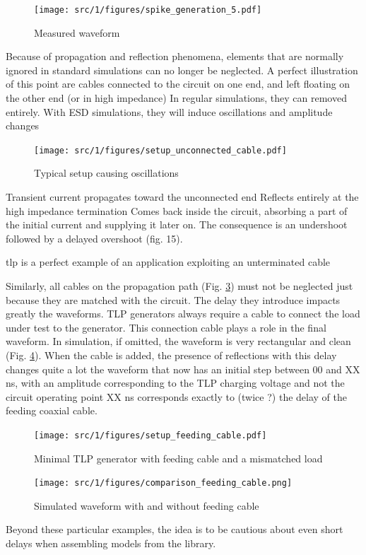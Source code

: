 \begin{figure}[!h]
  \centering
  \texttt{[image: src/1/figures/spike\_generation\_5.pdf]}
  \caption{Measured waveform}
  \label{fig:spike-step-4}
\end{figure}

Because of propagation and reflection phenomena, elements that are normally ignored in standard simulations can no longer be neglected.
A perfect illustration of this point are cables connected to the circuit on one end, and left floating on the other end (or in high impedance)
In regular simulations, they can removed entirely.
With ESD simulations, they will induce oscillations and amplitude changes

\begin{figure}[!h]
  \centering
  \texttt{[image: src/1/figures/setup\_unconnected\_cable.pdf]}
  \caption{Typical setup causing oscillations}
  \label{fig:setup-unconnected-cable}
\end{figure}

Transient current propagates toward the unconnected end
Reflects entirely at the high impedance termination
Comes back inside the circuit, absorbing a part of the initial current and supplying it later on.
The consequence is an undershoot followed by a delayed overshoot (fig. 15).

\gls{tlp} is a perfect example of an application exploiting an unterminated cable

Similarly, all cables on the propagation path (Fig. \ref{fig:setup-feeding-cable}) must not be neglected just because they are matched with the circuit.
The delay they introduce impacts greatly the waveforms.
TLP generators always require a cable to connect the load under test to the generator.
This connection cable plays a role in the final waveform.
In simulation, if omitted, the waveform is very rectangular and clean (Fig. \ref{fig:comparison-feeding-cable}).
When the cable is added, the presence of reflections with this delay changes quite a lot the waveform that now has an initial step between 00 and XX ns, with an amplitude corresponding to the TLP charging voltage and not the circuit operating point
XX ns corresponds exactly to (twice ?) the delay of the feeding coaxial cable.

\begin{figure}[!h]
  \centering
  \texttt{[image: src/1/figures/setup\_feeding\_cable.pdf]}
  \caption{Minimal TLP generator with feeding cable and a mismatched load}
  \label{fig:setup-feeding-cable}
\end{figure}

\begin{figure}[!h]
  \centering
  \texttt{[image: src/1/figures/comparison\_feeding\_cable.png]}
  \caption{Simulated waveform with and without feeding cable}
  \label{fig:comparison-feeding-cable}
\end{figure}

Beyond these particular examples, the idea is to be cautious about even short delays when assembling models from the library.

